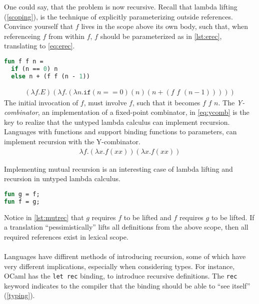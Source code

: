 \documentclass[11pt,oneside,a4paper]{report}
\begin{document}
One could say, that the problem is now recursive.
Recall that lambda lifting (\autoref{scoping}), is the technique of explicitly parameterizing outside references.
Convince yourself that $f$ lives in the scope above its own body, such that, when referenceing $f$ from within $f$, $f$ should be parameterized as in \autoref{lst:erec}, translating to \autoref{eq:erec}.
\begin{lstlisting}[language=ML,caption={Explicitly passing recursive function},label={lst:erec}]
fun f f n = 
  if (n == 0) n
  else n + (f f (n - 1))
\end{lstlisting}
\begin{align}
    (\lambda f . E) (\lambda f . (\lambda n . \texttt{if} (n == 0) (n) (n + (f \,\, f \,\, (n - 1)))))
    \label{eq:erec}
\end{align}
The initial invocation of $f$, must involve $f$, such that it becomes $f \,\, f \,\, n$.
The \textit{Y-combinator}, an implementation of a fixed-point combinator, in \autoref{eq:ycomb} is the key to realize that the untyped lambda calculus can implement recursion.
Languages with functions and support binding functions to parameters, can implement recursion with the Y-combinator.
\begin{align}
    \lambda f . (\lambda x . f (x x)) (\lambda x . f (x x))
    \label{eq:ycomb}
\end{align}

Implementing mutual recursion is an interesting case of lambda lifting and recursion in untyped lambda calculus.
\begin{lstlisting}[language=ML,caption={Mutual recursion},label={lst:mutrec}]
fun g = f;
fun f = g;
\end{lstlisting}
Notice in \autoref{lst:mutrec} that $g$ requires $f$ to be lifted and $f$ requires $g$ to be lifted.
If a translation ``pessimistically'' lifts all definitions from the above scope, then all required references exist in lexical scope.
\\\\
Languages have diffirent methods of introducing recursion, some of which have very different implications, especially when considering types.
For instance, OCaml has the \texttt{let rec} binding, to introduce recursive definitions.
The \texttt{rec} keyword indicates to the compiler that the binding should be able to ``see itself'' (\autoref{typing}).
\end{document}
